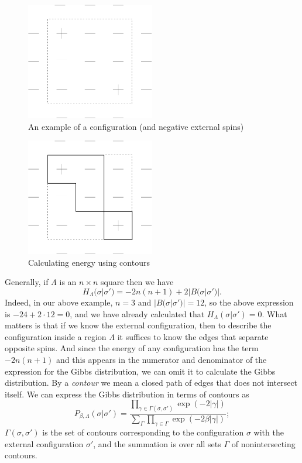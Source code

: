 \documentclass{article}
\begin{document}
\begin{figure}
\begin{center}
\includegraphics[width=0.5\textwidth]{config1}
\end{center}
\caption{An example of a configuration (and negative external spins)}
\label{figure1}
\end{figure}


\begin{figure}
\begin{center}
\includegraphics[width=0.5\textwidth]{config2}
\end{center}
\caption{Calculating energy using contours}
\label{figure2}
\end{figure}

Generally, if $\Lambda$ is an $n \times n$ square then we have
\[
H_\Lambda(\sigma|\sigma')=-2n(n+1)+2|B(\sigma|\sigma')|.
\]
Indeed, in our above example, $n=3$ and $|B(\sigma|\sigma')|=12$, so the above expression is $-24+2\cdot 12=0$, and we have already calculated that $H_\Lambda(\sigma|\sigma')=0$. What matters is that if we know the external configuration, then to describe the configuration inside a region $\Lambda$ it suffices to know the edges that separate opposite spins. And since the energy of any configuration has the term $-2n(n+1)$ and this appears in the numerator and denominator of the expression for the Gibbs distribution, we can omit it to calculate the Gibbs distribution. By a {\em contour} we mean a closed path of edges that does not intersect itself. We can express the Gibbs distribution in terms of contours as
\[
P_{\beta,\Lambda}(\sigma|\sigma')=\frac{\prod_{\gamma \in \Gamma(\sigma,\sigma')} \exp(-2|\gamma|)}{\sum_{\Gamma} \prod_{\gamma \in \Gamma} \exp(-2\beta|\gamma|)};
\]
$\Gamma(\sigma,\sigma')$ is the set of contours corresponding to the configuration $\sigma$ with the external configuration $\sigma'$, and the summation is over all sets $\Gamma$ of nonintersecting contours. 
\end{document}
